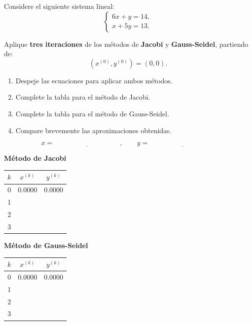 \documentclass[11pt,respuestas,a4]{aleph-examen}
\begin{document}
\begin{preguntas}


\item
Considere el siguiente sistema lineal: 
\[
\begin{cases}
6x+y=14,\\
x+5y=13.
\end{cases}
\]

Aplique \textbf{tres iteraciones} de los métodos de \textbf{Jacobi} y \textbf{Gauss-Seidel}, partiendo de:
\[
(x^{(0)},y^{(0)})=(0,0).
\]

\begin{enumerate}[label=\alph*)]
    \item Despeje las ecuaciones para aplicar ambos métodos.
    \item Complete la tabla para el método de Jacobi.
    \item Complete la tabla para el método de Gauss-Seidel.
    \item Compare brevemente las aproximaciones obtenidas.
\end{enumerate}

\[
x=\underline{\hspace{4cm}}, 
\qquad 
y=\underline{\hspace{4cm}}
\]

\begin{center}
\begin{minipage}{0.47\textwidth}
\centering
\textbf{Método de Jacobi}

\renewcommand{\arraystretch}{1.3}
\begin{tabular}{c|c|c}
\toprule
$k$ & $x^{(k)}$ & $y^{(k)}$ \\
\midrule
0 & 0.0000 & 0.0000 \\
1 &  &  \\
2 &  &  \\
3 &  &  \\
\bottomrule
\end{tabular}
\end{minipage}
\hfill
\begin{minipage}{0.47\textwidth}
\centering
\textbf{Método de Gauss-Seidel}

\renewcommand{\arraystretch}{1.3}
\begin{tabular}{c|c|c}
\toprule
$k$ & $x^{(k)}$ & $y^{(k)}$ \\
\midrule
0 & 0.0000 & 0.0000 \\
1 &  &  \\
2 &  &  \\
3 &  &  \\
\bottomrule
\end{tabular}
\end{minipage}
\end{center}


\end{preguntas}
\end{document}
